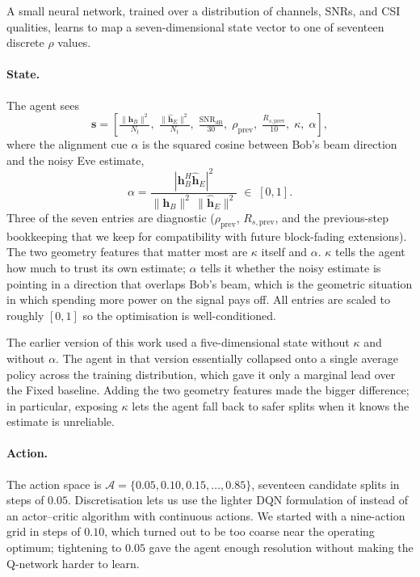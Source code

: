 \documentclass[conference]{IEEEtran}
\begin{document}
A small neural network, trained over a distribution of channels, SNRs,
and CSI qualities, learns to map a seven-dimensional state vector to
one of seventeen discrete $\rho$ values.

\paragraph{State.} The agent sees
\begin{equation}
\mathbf{s} = \left[
  \tfrac{\|\mathbf{h}_B\|^2}{N_t},\;
  \tfrac{\|\hat{\mathbf{h}}_E\|^2}{N_t},\;
  \tfrac{\mathrm{SNR}_{\mathrm{dB}}}{30},\;
  \rho_{\mathrm{prev}},\;
  \tfrac{R_{s,\mathrm{prev}}}{10},\;
  \kappa,\;
  \alpha
\right],
\label{eq:state}
\end{equation}
where the alignment cue $\alpha$ is the squared cosine between Bob's
beam direction and the noisy Eve estimate,
\begin{equation}
\alpha = \frac{|\mathbf{h}_B^H \hat{\mathbf{h}}_E|^2}
              {\|\mathbf{h}_B\|^2 \, \|\hat{\mathbf{h}}_E\|^2}
\;\in\; [0, 1].
\end{equation}
Three of the seven entries are diagnostic ($\rho_{\mathrm{prev}}$,
$R_{s,\mathrm{prev}}$, and the previous-step bookkeeping that we keep
for compatibility with future block-fading extensions). The two
geometry features that matter most are $\kappa$ itself and $\alpha$.
$\kappa$ tells the agent how much to trust its own estimate; $\alpha$
tells it whether the noisy estimate is pointing in a direction that
overlaps Bob's beam, which is the geometric situation in which
spending more power on the signal pays off. All entries are scaled to
roughly $[0, 1]$ so the optimisation is well-conditioned.

The earlier version of this work used a five-dimensional state without
$\kappa$ and without $\alpha$. The agent in that version essentially
collapsed onto a single average policy across the training
distribution, which gave it only a marginal lead over the Fixed
baseline. Adding the two geometry features made the bigger difference;
in particular, exposing $\kappa$ lets the agent fall back to safer
splits when it knows the estimate is unreliable.

\paragraph{Action.} The action space is
$\mathcal{A} = \{0.05, 0.10, 0.15, \ldots, 0.85\}$, seventeen
candidate splits in steps of $0.05$. Discretisation lets us use the
lighter DQN formulation of \cite{mnih2015human} instead of an
actor--critic algorithm with continuous actions. We started with a
nine-action grid in steps of $0.10$, which turned out to be too coarse
near the operating optimum; tightening to $0.05$ gave the agent enough
resolution without making the Q-network harder to learn.
\end{document}
